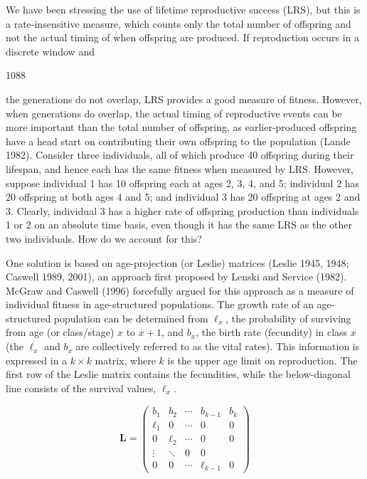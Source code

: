 \documentclass{article}
\begin{document}
We have been stressing the use of lifetime reproductive success (LRS), but this is a rate-insensitive measure, which counts only the total number of offspring and not the actual timing of when offspring are produced. If reproduction occurs in a discrete window and

1088

the generations do not overlap, LRS provides a good measure of fitness. However, when generations do overlap, the actual timing of reproductive events can be more important than the total number of offspring, as earlier-produced offspring have a head start on contributing their own offspring to the population (Lande 1982). Consider three individuals, all of which produce 40 offspring during their lifespan, and hence each has the same fitness when measured by LRS. However, suppose individual 1 has 10 offspring each at ages 2, 3, 4, and 5; individual 2 has 20 offspring at both ages 4 and 5; and individual 3 has 20 offspring at ages 2 and 3. Clearly, individual 3 has a higher rate of offspring production than individuals 1 or 2 on an absolute time basis, even though it has the same LRS as the other two individuals. How do we account for this?

One solution is based on age-projection (or Leslie) matrices (Leslie 1945, 1948; Caswell 1989, 2001), an approach first proposed by Lenski and Service (1982). McGraw and Caswell (1996) forcefully argued for this approach as a measure of individual fitness in age-structured populations. The growth rate of an age-structured population can be determined from  $ \ell_x $, the probability of surviving from age (or class/stage)  $ x $ to  $ x + 1 $, and  $ b_x $, the birth rate (fecundity) in class  $ x $ (the  $ \ell_x $ and  $ b_x $ are collectively referred to as the vital rates). This information is expressed in a  $ k \times k $ matrix, where  $ k $ is the upper age limit on reproduction. The first row of the Leslie matrix contains the fecundities, while the below-diagonal line consists of the survival values,  $ \ell_x $.

\begin{equation}
\mathbf{L}=\begin{pmatrix}{{{b_{1}}}}&{{{b_{2}}}}&{{{\cdots}}}&{{{b_{k-1}}}}&{{{b_{k}}}} \\{{{\ell_{1}}}}&{{{0}}}&{{{\cdots}}}&{{{0}}}&{{{0}}} \\{{{0}}}&{{{\ell_{2}}}}&{{{\cdots}}}&{{{0}}}&{{{0}}} \\{{{\vdots}}}&{{{\ddots}}}&{{{0}}}&{{{0}}} \\{{{0}}}&{{{0}}}&{{{\cdots}}}&{{{\ell_{k-1}}}}&{{{0}}}\end{pmatrix}
\tag{29.3a}
\label{eq:29_3a}
\end{equation}
\end{document}
